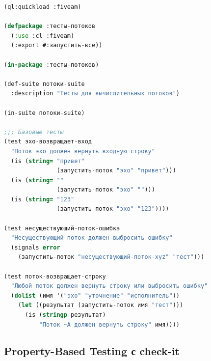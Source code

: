 \documentclass[10pt, oneside]{article}
\begin{document}
\begin{lstlisting}[language=CommonLisp,caption={Настройка fiveam для потоков}]
(ql:quickload :fiveam)

(defpackage :тесты-потоков
  (:use :cl :fiveam)
  (:export #:запустить-все))

(in-package :тесты-потоков)

(def-suite потоки-suite
  :description "Тесты для вычислительных потоков")

(in-suite потоки-suite)

;;; Базовые тесты
(test эхо-возвращает-вход
  "Поток эхо должен вернуть входную строку"
  (is (string= "привет"
               (запустить-поток "эхо" "привет")))
  (is (string= ""
               (запустить-поток "эхо" "")))
  (is (string= "123"
               (запустить-поток "эхо" "123"))))

(test несуществующий-поток-ошибка
  "Несуществующий поток должен выбросить ошибку"
  (signals error
    (запустить-поток "несуществующий-поток-xyz" "тест")))

(test поток-возвращает-строку
  "Любой поток должен вернуть строку или выбросить ошибку"
  (dolist (имя '("эхо" "уточнение" "исполнитель"))
    (let ((результат (запустить-поток имя "тест")))
      (is (stringp результат)
          "Поток ~A должен вернуть строку" имя))))
\end{lstlisting}

\subsection{Property-Based Testing с check-it}
\end{document}
